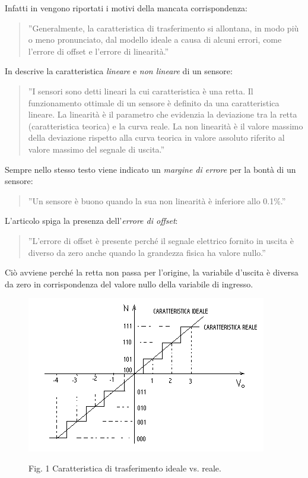 \documentclass[a4paper]{report} %
\begin{document}
Infatti in \cite{art:rif.1} vengono riportati i motivi della mancata corrispondenza:
\begin{quote} 
	''Generalmente, la caratteristica di trasferimento si allontana, in modo più o meno pronunciato, dal modello ideale a causa di alcuni errori, come l'errore di offset e l'errore di linearità.''
\end{quote}


In \cite{art:rif.11} descrive la caratteristica \textit{lineare} e \textit{non lineare} di un sensore:
\begin{quote}
	''I sensori sono detti lineari la cui caratteristica è una retta. Il funzionamento ottimale di un sensore è definito da una caratteristica lineare. La linearità è il parametro che evidenzia la deviazione tra la retta (caratteristica teorica) e la curva reale. 
	La non linearità è il valore massimo della deviazione rispetto alla curva teorica in valore assoluto riferito al valore massimo del segnale di uscita.''
\end{quote} 
Sempre nello stesso testo viene indicato un \textit{margine di errore} per la bontà di un sensore:	
\begin{quote}
	''Un sensore è buono quando la sua non linearità è inferiore allo 0.1\%.''
\end{quote}

L'articolo \cite{art:rif.1} spiga la presenza dell'\textit{errore di offset}:
\begin{quote} 
	''L'errore di offset è presente perché il segnale elettrico fornito in uscita è diverso da zero anche quando la grandezza fisica ha valore nullo.'' 
\end{quote} 	
Ciò avviene perché la retta non passa per l'origine, la variabile d'uscita è diversa da zero in corrispondenza del valore nullo della variabile di ingresso. 

\begin{figure}
	\centering
	\includegraphics[scale=.8]{Immagini/CarTrasferimento.png}
	
	Fig. 1 Caratteristica di trasferimento ideale vs. reale. \cite{art:rif.19}
\end{figure}
\end{document}
